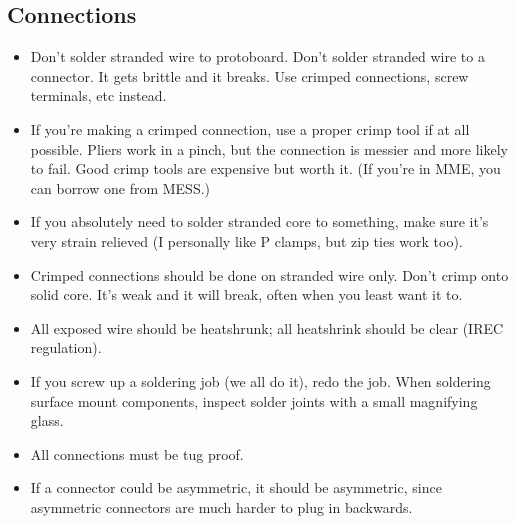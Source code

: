 \documentclass{article}
\begin{document}
\subsection{Connections}
\begin{itemize}
\item Don't solder stranded wire to protoboard. Don't solder stranded wire to a connector. It gets brittle and it breaks. Use crimped connections, screw terminals, etc instead.
\item If you're making a crimped connection, use a proper crimp tool if at all possible. Pliers work in a pinch, but the connection is messier and more likely to fail. Good crimp tools are expensive but worth it. (If you're in MME, you can borrow one from MESS.)
\item If you absolutely need to solder stranded core to something, make sure it's very strain relieved (I personally like P clamps, but zip ties work too).
\item Crimped connections should be done on stranded wire only. Don't crimp onto solid core. It's weak and it will break, often when you least want it to.
\item All exposed wire should be heatshrunk; all heatshrink should be clear (IREC regulation).
\item If you screw up a soldering job (we all do it), redo the job. When soldering surface mount components, inspect solder joints with a small magnifying glass.
\item All connections must be tug proof.
\item If a connector could be asymmetric, it should be asymmetric, since asymmetric connectors are much harder to plug in backwards.
\end{itemize}

\end{document}
